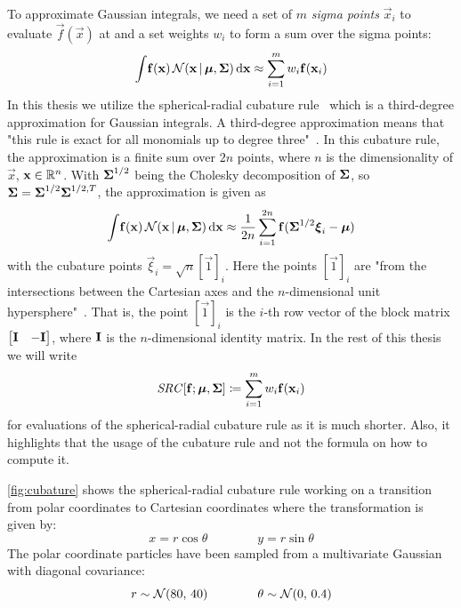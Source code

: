 	To approximate Gaussian integrals, we need a set of \(m\) \emph{sigma points} \( \vec{x}_i \) to evaluate \( \vec{f}(\vec{x}) \) at and a set weights \( w_i \) to form a sum over the sigma points:
	\begin{equation*}
		\int\! \boldsymbol{\mathrm{f}}(\boldsymbol{\mathrm{x}}) \, \mathcal{N}(\boldsymbol{\mathrm{x}} \,\vert\, \boldsymbol{\mathrm{\mu}}, \boldsymbol{\mathrm{\Sigma}}) \dd{\boldsymbol{\mathrm{x}}} \approx \sum_{i = 1}^{m} w_i \boldsymbol{\mathrm{f}}(\boldsymbol{\mathrm{x}}_i)
	\end{equation*}
	In this thesis we utilize the spherical-radial cubature rule~\cite{solinCubatureIntegrationMethods2010} which is a third-degree approximation for Gaussian integrals. A third-degree approximation means that "this rule is exact for all monomials up to degree three"~\cite[p. 18]{solinCubatureIntegrationMethods2010}. In this cubature rule, the approximation is a finite sum over \( 2n \) points, where \( n \) is the dimensionality of \(\vec{x}\), \ie \( \boldsymbol{\mathrm{x}} \in \mathbb{R}^n \). With \( \boldsymbol{\mathrm{\Sigma}}^{1/2} \) being the Cholesky decomposition of \( \boldsymbol{\mathrm{\Sigma}} \), so \( \boldsymbol{\mathrm{\Sigma}} = \boldsymbol{\mathrm{\Sigma}}^{1/2} \boldsymbol{\mathrm{\Sigma}}^{1/2, T} \), the approximation is given as
	\begin{equation*}
		\int\! \boldsymbol{\mathrm{f}}(\boldsymbol{\mathrm{x}}) \, \mathcal{N}(\boldsymbol{\mathrm{x}} \,\vert\, \boldsymbol{\mathrm{\mu}}, \boldsymbol{\mathrm{\Sigma}}) \dd{\boldsymbol{\mathrm{x}}} \approx \frac{1}{2n} \sum_{i = 1}^{2n} \boldsymbol{\mathrm{f}}(\boldsymbol{\mathrm{\Sigma}}^{1/2} \boldsymbol{\mathrm{\xi}}_i - \boldsymbol{\mathrm{\mu}})
	\end{equation*}
	with the cubature points \( \vec{\xi}_i = \sqrt{n} [\vec{1}]_i \). Here the points \( [\vec{1}]_i \) are "from the intersections between the Cartesian axes and the \(n\)-dimensional unit hypersphere"~\cite{solinCubatureIntegrationMethods2010}. That is, the point \( [\vec{1}]_i \) is the \(i\)-th row vector of the block matrix \( \begin{bmatrix} \boldsymbol{\mathrm{I}} & -\boldsymbol{\mathrm{I}} \end{bmatrix} \), where \( \boldsymbol{\mathrm{I}} \) is the \(n\)-dimensional identity matrix. In the rest of this thesis we will write
	\begin{equation*}
		\mathit{SRC}[\boldsymbol{\mathrm{f}}; \boldsymbol{\mathrm{\mu}}, \boldsymbol{\mathrm{\Sigma}}] \coloneqq \sum_{i = 1}^{m} w_i \boldsymbol{\mathrm{f}}(\boldsymbol{\mathrm{x}}_i)
	\end{equation*}
	for evaluations of the spherical-radial cubature rule as it is much shorter. Also, it highlights that the usage of the cubature rule and not the formula on how to compute it.

	\autoref{fig:cubature} shows the spherical-radial cubature rule working on a transition from polar coordinates to Cartesian coordinates where the transformation is given by:
	\begin{equation*}
		x = r \cos\theta \qquad\qquad y = r \sin\theta
	\end{equation*}
	The polar coordinate particles have been sampled from a multivariate Gaussian with diagonal covariance:
	\begin{equation*}
		r \sim \mathcal{N}(80,\, 40) \qquad\qquad \theta \sim \mathcal{N}(0,\, 0.4)
	\end{equation*}

